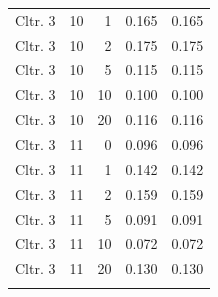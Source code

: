 \begin{longtable}{lrrrr}
  Cltr. 3 &   10 &    1 & 0.165 & 0.165 \\ 
  Cltr. 3 &   10 &    2 & 0.175 & 0.175 \\ 
  Cltr. 3 &   10 &    5 & 0.115 & 0.115 \\ 
  Cltr. 3 &   10 &   10 & 0.100 & 0.100 \\ 
  Cltr. 3 &   10 &   20 & 0.116 & 0.116 \\ 
  Cltr. 3 &   11 &    0 & 0.096 & 0.096 \\ 
  Cltr. 3 &   11 &    1 & 0.142 & 0.142 \\ 
  Cltr. 3 &   11 &    2 & 0.159 & 0.159 \\ 
  Cltr. 3 &   11 &    5 & 0.091 & 0.091 \\ 
  Cltr. 3 &   11 &   10 & 0.072 & 0.072 \\ 
  Cltr. 3 &   11 &   20 & 0.130 & 0.130 \\ 
   \bottomrule
\label{tab:AB_Mbovi_sens}
\end{longtable}
